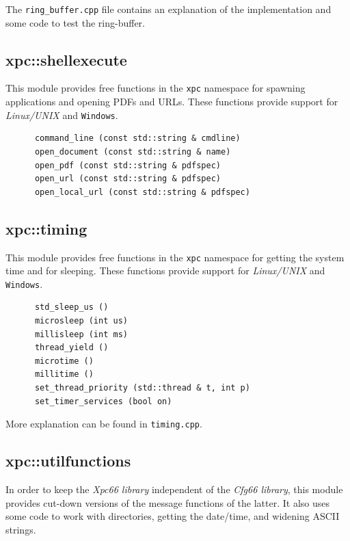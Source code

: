    The \texttt{ring\_buffer.cpp} file contains an explanation of the
   implementation and some code to test the ring-buffer.

\subsection{xpc::shellexecute}
\label{subsec:xpc_namespace_shellexecute}

   This module provides free functions in the \texttt{xpc} namespace
   for spawning applications and opening PDFs and URLs.
   These functions provide support for
   \textsl{Linux/UNIX} and \texttt{Windows}.

   \begin{verbatim}
      command_line (const std::string & cmdline)
      open_document (const std::string & name)
      open_pdf (const std::string & pdfspec)
      open_url (const std::string & pdfspec)
      open_local_url (const std::string & pdfspec)
   \end{verbatim}

\subsection{xpc::timing}
\label{subsec:xpc_namespace_timing}

   This module provides free functions in the \texttt{xpc} namespace
   for getting the system time and for sleeping.
   These functions provide support for
   \textsl{Linux/UNIX} and \texttt{Windows}.

   \begin{verbatim}
      std_sleep_us ()
      microsleep (int us)
      millisleep (int ms)
      thread_yield ()
      microtime ()
      millitime ()
      set_thread_priority (std::thread & t, int p)
      set_timer_services (bool on)
   \end{verbatim}

   More explanation can be found in \texttt{timing.cpp}.

\subsection{xpc::utilfunctions}
\label{subsec:xpc_namespace_utilfunctions}

   In order to keep the \textsl{Xpc66 library} independent
   of the \textsl{Cfg66 library}, this module
   provides cut-down versions of the message functions of
   the latter.
   It also uses some code to work with directories,
   getting the date/time, and widening ASCII strings.

